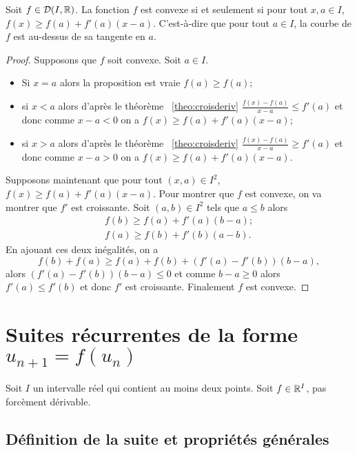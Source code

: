 \begin{theo}
  Soit \(f \in \mathcal{D}(I,\mathbb{R})\). La fonction \(f\) est convexe si et seulement si pour tout \(x,a \in I\), \(f(x) \geqslant f(a)+f'(a)(x-a)\). C'est-à-dire que pour tout \(a \in I\), la courbe de \(f\) est au-dessus de sa tangente en \(a\).
\end{theo}
\begin{proof}
  Supposons que \(f\) soit convexe. Soit \(a \in I\).
  \begin{itemize}
  \item Si \(x=a\) alors la proposition est vraie \(f(a) \geqslant f(a)\);
  \item si \(x < a\) alors d'après le théorème~
\ref{theo:croisderiv} \(\frac{f(x)-f(a)}{x-a} \leqslant f'(a)\) et donc comme \(x-a <0\) on a \(f(x) \geqslant f(a)+f'(a)(x-a)\);
  \item si \(x > a\) alors d'après le théorème~
\ref{theo:croisderiv} \(\frac{f(x)-f(a)}{x-a} \geqslant f'(a)\) et donc comme \(x-a >0\) on a \(f(x) \geqslant f(a)+f'(a)(x-a)\).
  \end{itemize}

  Supposons maintenant que  pour tout \((x,a) \in I^2\), \(f(x) \geqslant f(a)+f'(a)(x-a)\). Pour montrer que \(f\) est convexe, on va montrer que \(f'\) est croissante. Soit \((a,b) \in I^2\) tels que \(a \leqslant b\) alors
  \begin{align}
    f(b) \geqslant f(a)+f'(a)(b-a); \\
    f(a) \geqslant f(b)+f'(b)(a-b).
  \end{align}
  En ajouant ces deux inégalités, on a
  \begin{equation}
    f(b)+f(a) \geqslant f(a)+f(b) +(f'(a)-f'(b))(b-a),
  \end{equation}
  alors \((f'(a)-f'(b))(b-a) \leqslant 0\) et comme \(b-a \geqslant 0\) alors \(f'(a) \leqslant f'(b)\) et donc \(f'\) est croissante. Finalement \(f\) est convexe.
\end{proof}

\section{Suites récurrentes de la forme \(u_{n+1}=f(u_n)\)}

Soit \(I\) un intervalle réel qui contient au moins deux points. Soit \(f \in \mathbb{R}^I\), pas forcèment dérivable.

\subsection{Définition de la suite et propriétés générales}

